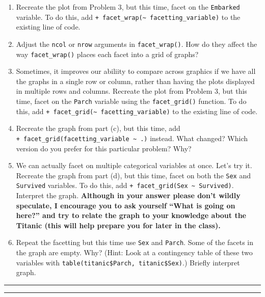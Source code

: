 \documentclass[]{article}
\begin{document}
\begin{enumerate}
\def\labelenumi{\alph{enumi}.}
\item
  Recreate the plot from Problem 3, but this time, facet on the
  \texttt{Embarked} variable. To do this, add
  \texttt{+\ facet\_wrap(\textasciitilde{}\ facetting\_variable)} to the
  existing line of code.
\item
  Adjust the \texttt{ncol} or \texttt{nrow} arguments in
  \texttt{facet\_wrap()}. How do they affect the way
  \texttt{facet\_wrap()} places each facet into a grid of graphs?
\item
  Sometimes, it improves our abiliity to compare across graphics if we
  have all the graphs in a single row or column, rather than having the
  plots displayed in multiple rows and columns. Recreate the plot from
  Problem 3, but this time, facet on the \texttt{Parch} variable using
  the \texttt{facet\_grid()} function. To do this, add
  \texttt{+\ facet\_grid(\textasciitilde{}\ facetting\_variable)} to the
  existing line of code.
\item
  Recreate the graph from part (c), but this time, add
  \texttt{+\ facet\_grid(facetting\_variable\ \textasciitilde{}\ .)}
  instead. What changed? Which version do you prefer for this particular
  problem? Why?
\item
  We can actually facet on multiple categorical variables at once. Let's
  try it. Recreate the graph from part (d), but this time, facet on both
  the \texttt{Sex} and \texttt{Survived} variables. To do this, add
  \texttt{+\ facet\_grid(Sex\ \textasciitilde{}\ Survived)}. Interpret
  the graph. \textbf{Although in your answer please don't wildly
  speculate, I encourage you to ask yourself ``What is going on here?''
  and try to relate the graph to your knowledge about the Titanic (this
  will help prepare you for later in the class).}
\item
  Repeat the facetting but this time use \texttt{Sex} and
  \texttt{Parch}. Some of the facets in the graph are empty. Why? (Hint:
  Look at a contingency table of these two variables with
  \texttt{table(titanic\$Parch,\ titanic\$Sex)}.) Briefly interpret
  graph.
\end{enumerate}

\begin{center}\rule{0.5\linewidth}{\linethickness}\end{center}

\begin{center}\rule{0.5\linewidth}{\linethickness}\end{center}
\end{document}
